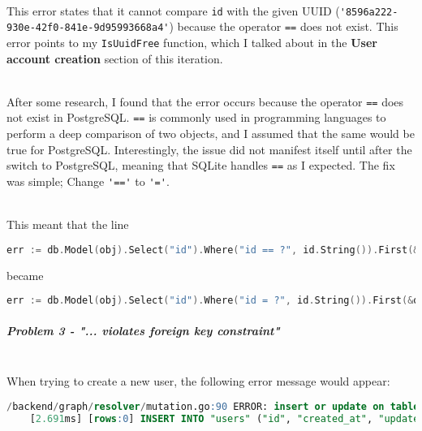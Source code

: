 \documentclass[../../main.tex]{subfiles}
\begin{document}
\noindent \\ This error states that it cannot compare \lstinline{id} with the given UUID (\lstinline{'8596a222-930e-42f0-841e-9d95993668a4'}) because the operator \lstinline{==} does not exist.
This error points to my \lstinline{IsUuidFree} function, which I talked about in the \textbf{User account creation} section of this iteration.

\noindent \\ After some research, I found that the error occurs because the operator \lstinline{==} does not exist in PostgreSQL. \lstinline{==} is commonly used in programming languages to perform a deep comparison of two objects, and I assumed that the same would be true for PostgreSQL.
Interestingly, the issue did not manifest itself until after the switch to PostgreSQL, meaning that SQLite handles \lstinline{==} as I expected.
The fix was simple; Change \lstinline{'=='} to \lstinline{'='}.

\noindent \\ This meant that the line

\begin{lstlisting}[language=Go]
        err := db.Model(obj).Select("id").Where("id == ?", id.String()).First(&obj).Error
    \end{lstlisting}

\noindent became

\begin{lstlisting}[language=Go]
        err := db.Model(obj).Select("id").Where("id = ?", id.String()).First(&obj).Error
    \end{lstlisting}

\begin{comment}
POLISH END
\end{comment}

\subparagraph{Problem 3 - "... violates foreign key constraint"}

\noindent \\ When trying to create a new user, the following error message would appear:

\begin{lstlisting}[language=SQL]
    /backend/graph/resolver/mutation.go:90 ERROR: insert or update on table "users" violates foreign key constraint "fk_checkouts_user" (SQLSTATE 23503)
    [2.691ms] [rows:0] INSERT INTO "users" ("id", "created_at", "updated_at", "deleted_at", "first_name", "last_name", "email", "hash") VALUES [..]
    \end{lstlisting}
\end{document}
